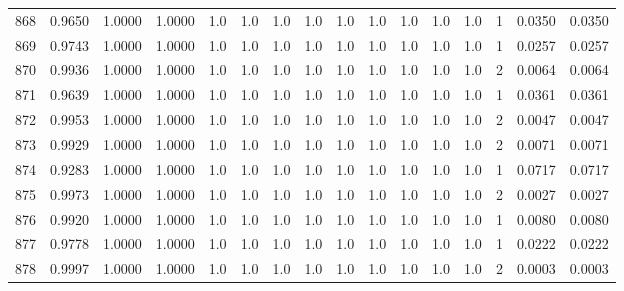 \begin{tabular}{lrrrrrrrrrrrrrrr}
868 &      0.9650 &  1.0000 &  1.0000 &     1.0 &     1.0 &     1.0 &     1.0 &     1.0 &     1.0 &     1.0 &      1.0 &        1.0 &      1 &                    0.0350 &                     0.0350 \\
869 &      0.9743 &  1.0000 &  1.0000 &     1.0 &     1.0 &     1.0 &     1.0 &     1.0 &     1.0 &     1.0 &      1.0 &        1.0 &      1 &                    0.0257 &                     0.0257 \\
870 &      0.9936 &  1.0000 &  1.0000 &     1.0 &     1.0 &     1.0 &     1.0 &     1.0 &     1.0 &     1.0 &      1.0 &        1.0 &      2 &                    0.0064 &                     0.0064 \\
871 &      0.9639 &  1.0000 &  1.0000 &     1.0 &     1.0 &     1.0 &     1.0 &     1.0 &     1.0 &     1.0 &      1.0 &        1.0 &      1 &                    0.0361 &                     0.0361 \\
872 &      0.9953 &  1.0000 &  1.0000 &     1.0 &     1.0 &     1.0 &     1.0 &     1.0 &     1.0 &     1.0 &      1.0 &        1.0 &      2 &                    0.0047 &                     0.0047 \\
873 &      0.9929 &  1.0000 &  1.0000 &     1.0 &     1.0 &     1.0 &     1.0 &     1.0 &     1.0 &     1.0 &      1.0 &        1.0 &      2 &                    0.0071 &                     0.0071 \\
874 &      0.9283 &  1.0000 &  1.0000 &     1.0 &     1.0 &     1.0 &     1.0 &     1.0 &     1.0 &     1.0 &      1.0 &        1.0 &      1 &                    0.0717 &                     0.0717 \\
875 &      0.9973 &  1.0000 &  1.0000 &     1.0 &     1.0 &     1.0 &     1.0 &     1.0 &     1.0 &     1.0 &      1.0 &        1.0 &      2 &                    0.0027 &                     0.0027 \\
876 &      0.9920 &  1.0000 &  1.0000 &     1.0 &     1.0 &     1.0 &     1.0 &     1.0 &     1.0 &     1.0 &      1.0 &        1.0 &      1 &                    0.0080 &                     0.0080 \\
877 &      0.9778 &  1.0000 &  1.0000 &     1.0 &     1.0 &     1.0 &     1.0 &     1.0 &     1.0 &     1.0 &      1.0 &        1.0 &      1 &                    0.0222 &                     0.0222 \\
878 &      0.9997 &  1.0000 &  1.0000 &     1.0 &     1.0 &     1.0 &     1.0 &     1.0 &     1.0 &     1.0 &      1.0 &        1.0 &      2 &                    0.0003 &                     0.0003 \\

\end{tabular}
